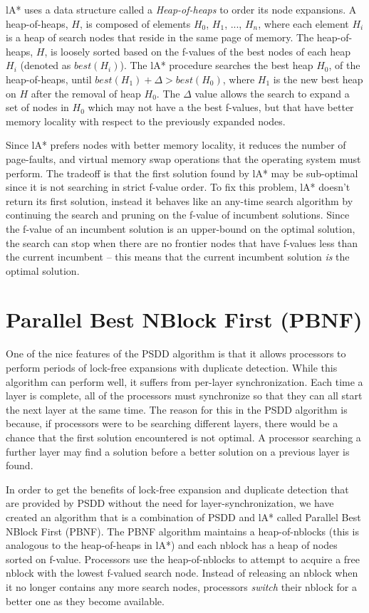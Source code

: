 \documentclass{article}
\begin{document}
lA* uses a data structure called a \emph{Heap-of-heaps} to order its
node expansions.  A heap-of-heaps, $H$, is composed of elements $H_0$,
$H_1$, ..., $H_n$, where each element $H_i$ is a heap of search nodes
that reside in the same page of memory.  The heap-of-heaps, $H$, is
loosely sorted based on the f-values of the best nodes of each heap
$H_i$ (denoted as $best(H_i)$).  The lA* procedure searches the best
heap $H_0$, of the heap-of-heaps, until $best(H_1) + \Delta >
best(H_0)$, where $H_1$ is the new best heap on $H$ after the removal
of heap $H_0$.  The $\Delta$ value allows the search to expand a set
of nodes in $H_0$ which may not have a the best f-values, but that
have better memory locality with respect to the previously expanded
nodes.

Since lA* prefers nodes with better memory locality, it reduces the
number of page-faults, and virtual memory swap operations that the
operating system must perform.  The tradeoff is that the first
solution found by lA* may be sub-optimal since it is not searching in
strict f-value order.  To fix this problem, lA* doesn't return its
first solution, instead it behaves like an any-time search algorithm
by continuing the search and pruning on the f-value of incumbent
solutions.  Since the f-value of an incumbent solution is an
upper-bound on the optimal solution, the search can stop when there
are no frontier nodes that have f-values less than the current
incumbent -- this means that the current incumbent solution \emph{is}
the optimal solution.

\section{Parallel Best NBlock First (PBNF)}

One of the nice features of the PSDD algorithm is that it allows
processors to perform periods of lock-free expansions with duplicate
detection.  While this algorithm can perform well, it suffers from
per-layer synchronization.  Each time a layer is complete, all of the
processors must synchronize so that they can all start the next layer
at the same time.  The reason for this in the PSDD algorithm is
because, if processors were to be searching different layers, there
would be a chance that the first solution encountered is not optimal.
A processor searching a further layer may find a solution before a
better solution on a previous layer is found.

In order to get the benefits of lock-free expansion and duplicate
detection that are provided by PSDD without the need for
layer-synchronization, we have created an algorithm that is a
combination of PSDD and lA* called Parallel Best NBlock First (PBNF).
The PBNF algorithm maintains a heap-of-nblocks (this is analogous to
the heap-of-heaps in lA*) and each nblock has a heap of nodes sorted
on f-value.  Processors use the heap-of-nblocks to attempt to acquire
a free nblock with the lowest f-valued search node.  Instead of
releasing an nblock when it no longer contains any more search nodes,
processors \emph{switch} their nblock for a better one as they become
available.
\end{document}
